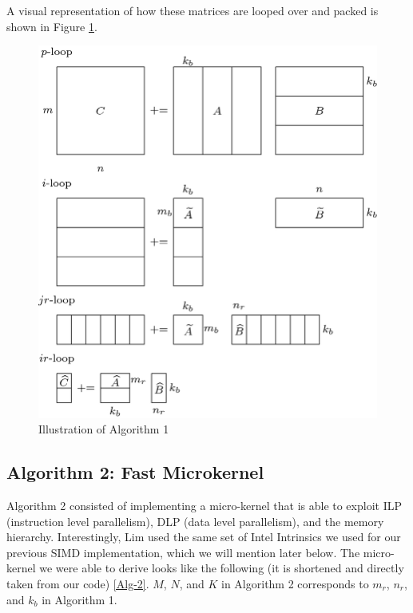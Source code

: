 \documentclass{article}
\begin{document}
A visual representation of how these matrices are looped over and packed is shown in Figure \ref{fig:algo}.

\begin{figure}[H]
  \centerline{\includegraphics[width=6in]{figures/Illustration-of-Algorithm-1.png}}
  \caption{Illustration of Algorithm 1 \cite{10.1007/s10586-018-2810-y}}
  \label{fig:algo}
\end{figure}

\subsection{Algorithm 2: Fast Microkernel}
Algorithm 2 consisted of implementing a micro-kernel that is able to exploit ILP (instruction level parallelism), DLP (data level parallelism), and the memory hierarchy. Interestingly, Lim \cite{10.1007/s10586-018-2810-y} used the same set of Intel Intrinsics we used for our previous SIMD implementation, which we will mention later below. The micro-kernel we were able to derive looks like the following (it is shortened and directly taken from our code) \ref{Alg-2}. $M$, $N$, and $K$ in Algorithm 2 corresponds to $m_r$, $n_r$, and $k_b$ in Algorithm 1.
\end{document}
